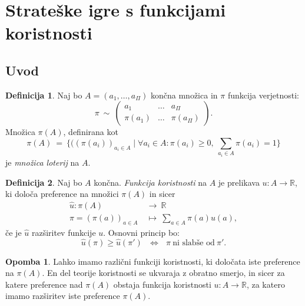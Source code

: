 \documentclass[11pt]{article}
\newcommand{\R}{\mathbb{R}}
\newcommand{\set}[1]{\{#1\}}
\newcommand{\1}{\mathbbm{1}}
\theoremstyle{definition}
\newtheorem{definicija}{Definicija}[section]
\theoremstyle{definition}
\theoremstyle{definition}
\theoremstyle{definition}
\newtheorem*{opomba}{Opomba}
\begin{document}
\pagebreak


\section{Strateške igre s funkcijami koristnosti}
\vspace{0.5cm}


\subsection{Uvod}
\vspace{0.5cm}

\begin{definicija}

Naj bo $A = (a_1,\ldots,a_\Pi)$ končna množica in $\pi$ funkcija verjetnosti:
$$\pi ~\sim~ \begin{pmatrix}
a_1 & \ldots & a_\Pi \\
\pi(a_1) & \ldots & \pi(a_\Pi)
\end{pmatrix}.$$ 
Množica $\pi(A)$, definirana kot
$$\pi(A) ~=~ \set{((\pi(a_i))_{a_i \in A} \mid \forall a_i \in A: \pi(a_i) \geq 0, ~\sum_{a_i \in A} \pi(a_i) = 1}$$
je \textit{množica loterij} na $A$.

\end{definicija}
\vspace{0.5cm}

\begin{definicija}

Naj bo $A$ končna. \textit{Funkcija koristnosti} na $A$ je prelikava $u: A \rightarrow \R$, ki določa preference na množici $\pi(A)$ in sicer
\begin{align*}
\hat{u}: \pi(A) ~&\rightarrow~ \R \\
\pi = (\pi(a))_{a \in A} ~&\mapsto~ \sum_{a \in A} \pi(a) u(a),
\end{align*}
če je $\hat{u}$ razširitev funkcije $u$. Osnovni princip bo:
$$\hat{u}(\pi) \geq \hat{u}(\pi') ~~~\iff~~~ \pi ~\text{ni slabše od}~ \pi'.$$

\end{definicija}
\vspace{0.5cm}

\begin{opomba}

Lahko imamo različni funkciji koristnosti, ki določata iste preference na $\pi(A)$. En del teorije koristnosti se ukvaraja z obratno smerjo, in sicer za katere preference nad $\pi(A)$ obstaja funkcija koristnosti $u: A \rightarrow \R$, za katero imamo razširitev iste preference $\pi(A)$.

\end{opomba}
\vspace{0.5cm}
\end{document}
